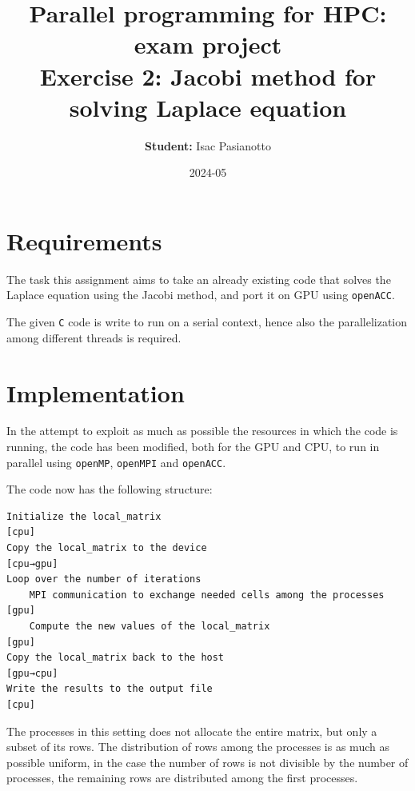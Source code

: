 \documentclass{article}
\title{Parallel programming for HPC: exam project\\ Exercise 2: Jacobi method for solving Laplace equation}
\author{\textbf{Student:} Isac Pasianotto}
\date{2024-05}
\begin{document}
    \maketitle

    \section{Requirements}

    The task this assignment aims to take an already existing code that solves the Laplace equation using the Jacobi method, and port it on GPU using \texttt{openACC}.

    \noindent The given \texttt{C} code is write to run on a serial context, hence also the parallelization among different threads is required.

   \section{Implementation}

    In the attempt to exploit as much as possible the resources in which the code is running, the code has been modified, both for the GPU and CPU,
    to run in parallel using \texttt{openMP}, \texttt{openMPI} and \texttt{openACC}.

    \noindent The code now has the following structure:

    \begin{verbatim}
Initialize the local_matrix                                                    [cpu]
Copy the local_matrix to the device                                            [cpu→gpu]
Loop over the number of iterations
    MPI communication to exchange needed cells among the processes              [gpu]
    Compute the new values of the local_matrix                                  [gpu]
Copy the local_matrix back to the host                                          [gpu→cpu]
Write the results to the output file                                            [cpu]
    \end{verbatim}

    The processes in this setting does not allocate the entire matrix, but only a subset of its rows.
    The distribution of rows among the processes is as much as possible uniform, in the case the number of rows is not divisible by the number of processes,
    the remaining rows are distributed among the first processes.
\end{document}
